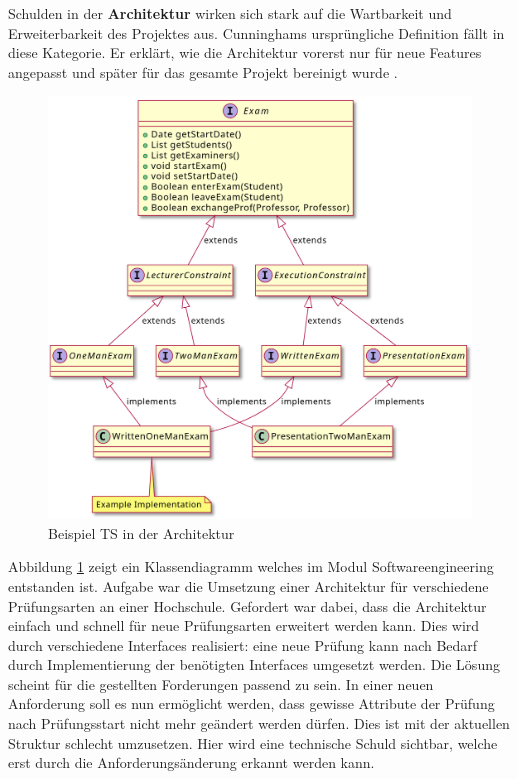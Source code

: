 \documentclass[acmtog]{acmart}
\begin{document}
Schulden in der \textbf{Architektur} wirken sich stark auf die Wartbarkeit und
Erweiterbarkeit des Projektes aus. Cunninghams ursprüngliche Definition fällt
in diese Kategorie. Er erklärt, wie die Architektur vorerst nur für neue
Features angepasst und später für das gesamte Projekt bereinigt wurde \cite{Cunningham92}.

\begin{figure}[t]
  \centering
  \includegraphics[width=\linewidth]{images/ArchitectureExample01.png}
  \caption{Beispiel TS in der Architektur}
  \label{fig:BeispielArchitektur_TS}
\end{figure}

Abbildung \ref{fig:BeispielArchitektur_TS} zeigt ein Klassendiagramm welches im
Modul Softwareengineering entstanden ist. Aufgabe war die Umsetzung einer Architektur
für verschiedene Prüfungsarten an einer Hochschule. Gefordert war dabei, dass die
Architektur einfach und schnell für neue Prüfungsarten erweitert werden kann. Dies
wird durch verschiedene Interfaces realisiert: eine neue Prüfung kann nach Bedarf
durch Implementierung der benötigten Interfaces umgesetzt werden. Die Lösung scheint
für die gestellten Forderungen passend zu sein. In einer neuen Anforderung soll es
nun ermöglicht werden, dass gewisse Attribute der Prüfung nach Prüfungsstart nicht
mehr geändert werden dürfen. Dies ist mit der aktuellen Struktur schlecht umzusetzen.
Hier wird eine technische Schuld sichtbar, welche erst durch die Anforderungsänderung
erkannt werden kann.
\end{document}
